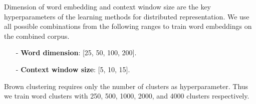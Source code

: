 Dimension of word embedding and context window size are the key hyperparameters of the learning methods for distributed representation. We use all possible combinations from the following ranges to train word embeddings on the combined corpus.
\begin{small}
\begin{itemize}
\item[-]\textbf{Word dimension}: [25, 50, 100, 200].
\item[-]\textbf{Context window size}: [5, 10, 15].
\end{itemize}
\end{small}
Brown clustering requires only the number of clusters as hyperparameter. Thus we train word clusters with 250, 500, 1000, 2000, and 4000 clusters respectively. 
%
%
%
%
%
% 
%
